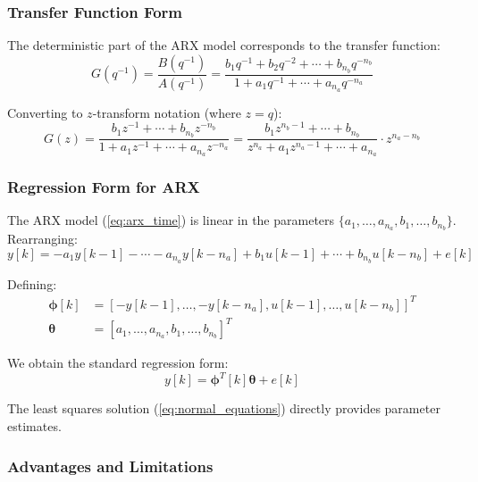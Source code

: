 \subsubsection{Transfer Function Form}

The deterministic part of the ARX model corresponds to the transfer function:
\begin{equation}
G(q^{-1}) = \frac{B(q^{-1})}{A(q^{-1})} = \frac{b_1 q^{-1} + b_2 q^{-2} + \cdots + b_{n_b} q^{-n_b}}{1 + a_1 q^{-1} + \cdots + a_{n_a} q^{-n_a}}
\label{eq:arx_tf}
\end{equation}

Converting to $z$-transform notation (where $z = q$):
\begin{equation}
G(z) = \frac{b_1 z^{-1} + \cdots + b_{n_b} z^{-n_b}}{1 + a_1 z^{-1} + \cdots + a_{n_a} z^{-n_a}} = \frac{b_1 z^{n_b-1} + \cdots + b_{n_b}}{z^{n_a} + a_1 z^{n_a-1} + \cdots + a_{n_a}} \cdot z^{n_a - n_b}
\label{eq:arx_z}
\end{equation}

\subsubsection{Regression Form for ARX}

The ARX model (\ref{eq:arx_time}) is linear in the parameters $\{a_1, \ldots, a_{n_a}, b_1, \ldots, b_{n_b}\}$. Rearranging:
\begin{equation}
y[k] = -a_1 y[k-1] - \cdots - a_{n_a} y[k-n_a] + b_1 u[k-1] + \cdots + b_{n_b} u[k-n_b] + e[k]
\end{equation}

Defining:
\begin{align}
\boldsymbol{\phi}[k] &= [-y[k-1], \ldots, -y[k-n_a], u[k-1], \ldots, u[k-n_b]]^T \\
\boldsymbol{\theta} &= [a_1, \ldots, a_{n_a}, b_1, \ldots, b_{n_b}]^T
\end{align}

We obtain the standard regression form:
\begin{equation}
y[k] = \boldsymbol{\phi}^T[k] \boldsymbol{\theta} + e[k]
\end{equation}

The least squares solution (\ref{eq:normal_equations}) directly provides parameter estimates.

\subsubsection{Advantages and Limitations}

